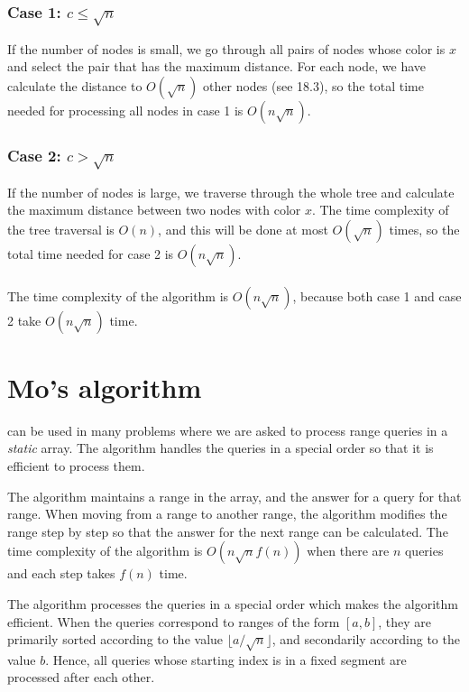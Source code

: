 \subsubsection*{Case 1: $c \le \sqrt n$}

If the number of nodes is small,
we go through all pairs of nodes whose
color is $x$ and select the pair that
has the maximum distance.
For each node, we have calculate the distance
to $O(\sqrt n)$ other nodes (see 18.3),
so the total time needed for processing all
nodes in case 1 is $O(n \sqrt n)$.

\subsubsection*{Case 2: $c > \sqrt n$}

If the number of nodes is large,
we traverse through the whole tree
and calculate the maximum distance between
two nodes with color $x$.
The time complexity of the tree traversal is $O(n)$,
and this will be done at most $O(\sqrt n)$ times,
so the total time needed for case 2 is
$O(n \sqrt n)$.\\\\
\noindent
The time complexity of the algorithm is $O(n \sqrt n)$,
because both case 1 and case 2 take $O(n \sqrt n)$ time.

\section{Mo's algorithm}


 can be used in many problems
where we are asked to process range queries in 
a \emph{static} array.
The algorithm handles the queries in a special order
so that it is efficient to process them.

The algorithm maintains a range in the array,
and the answer for a query for that range.
When moving from a range to another range,
the algorithm modifies the range step by step
so that the answer for the next range can be
calculated.
The time complexity of the algorithm is
$O(n \sqrt n f(n))$ when there are $n$ queries
and each step takes $f(n)$ time.

The algorithm processes the queries in a special
order which makes the algorithm efficient.
When the queries correspond to ranges of the form $[a,b]$,
they are primarily sorted according to
the value $\lfloor a/\sqrt n \rfloor$,
and secondarily according to the value $b$.
Hence, all queries whose starting index
is in a fixed segment 
are processed after each other.

